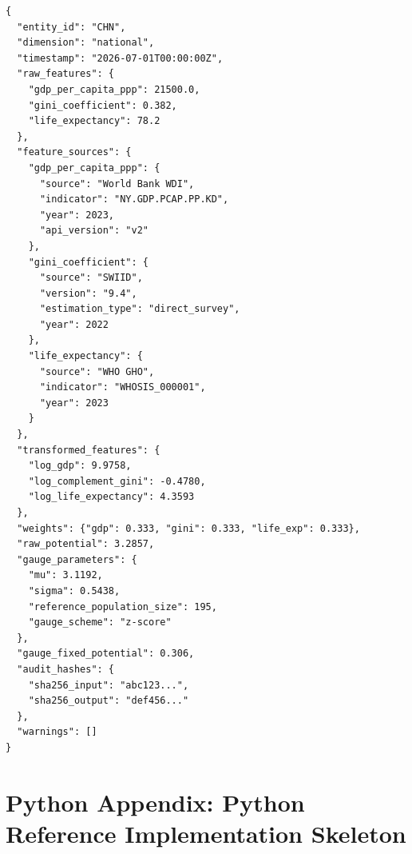 \documentclass[11pt,a4paper]{article}
\theoremstyle{definition}
\begin{document}
\begin{verbatim}
{
  "entity_id": "CHN",
  "dimension": "national",
  "timestamp": "2026-07-01T00:00:00Z",
  "raw_features": {
    "gdp_per_capita_ppp": 21500.0,
    "gini_coefficient": 0.382,
    "life_expectancy": 78.2
  },
  "feature_sources": {
    "gdp_per_capita_ppp": {
      "source": "World Bank WDI",
      "indicator": "NY.GDP.PCAP.PP.KD",
      "year": 2023,
      "api_version": "v2"
    },
    "gini_coefficient": {
      "source": "SWIID",
      "version": "9.4",
      "estimation_type": "direct_survey",
      "year": 2022
    },
    "life_expectancy": {
      "source": "WHO GHO",
      "indicator": "WHOSIS_000001",
      "year": 2023
    }
  },
  "transformed_features": {
    "log_gdp": 9.9758,
    "log_complement_gini": -0.4780,
    "log_life_expectancy": 4.3593
  },
  "weights": {"gdp": 0.333, "gini": 0.333, "life_exp": 0.333},
  "raw_potential": 3.2857,
  "gauge_parameters": {
    "mu": 3.1192,
    "sigma": 0.5438,
    "reference_population_size": 195,
    "gauge_scheme": "z-score"
  },
  "gauge_fixed_potential": 0.306,
  "audit_hashes": {
    "sha256_input": "abc123...",
    "sha256_output": "def456..."
  },
  "warnings": []
}
\end{verbatim}

\section{Python Appendix: Python Reference Implementation Skeleton}
\end{document}
